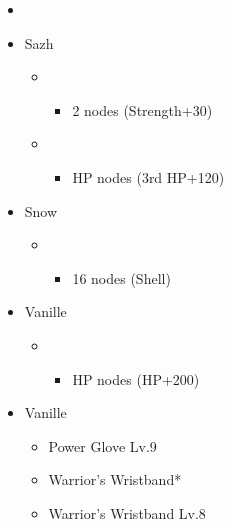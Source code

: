 \begin{menu}
	\begin{itemize}
	\paradigm
		\begin{itemize}
			\item {}%
				{\paradigmline{\com}{\sen}{\com}}%
				{\paradigmline[4]{\com}{(\sen)}{\sab}}%
				{\paradigmline{\rav}{\sen}{\rav}}%
				{\paradigmline{(\sen)}{(\sen)}{(\com)}}%
				{\paradigmline{\syn}{\sen}{(\med)}}%
				{\paradigmline{(\sen)}{(\rav)}{\sab}}%
		\end{itemize}
	\crystarium
		\begin{itemize}
			\item Sazh
				\begin{itemize}
					\item \com
						\begin{itemize}
							\item 2 nodes (Strength+30)
						\end{itemize}		
					\item \syn
						\begin{itemize}
							\item HP nodes (3rd HP+120)
						\end{itemize}
				\end{itemize}
			\item Snow
				\begin{itemize}
					\item \syn
						\begin{itemize}
							\item 16 nodes (Shell)
						\end{itemize}
				\end{itemize}
			\item Vanille
				\begin{itemize}
					\item \sab
						\begin{itemize}
							\item HP nodes (HP+200)
						\end{itemize}		
				\end{itemize}								
		\end{itemize}
	\equip
		\begin{itemize}
			\item Vanille
				\begin{itemize}
					\item Power Glove Lv.9	
					\item Warrior's Wristband*
					\item Warrior's Wristband Lv.8
				\end{itemize}
		\end{itemize}
	\end{itemize}
\end{menu}

